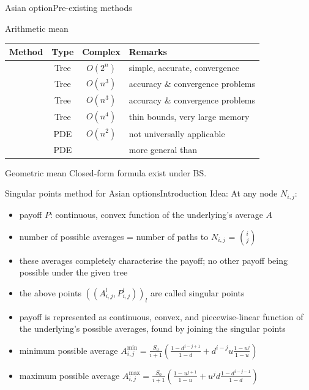 \documentclass[utf8,t,compress,xcolor=svgnames,handout]{beamer}
\begin{document}
	
	\begin{frame}{Asian option}{Pre-existing methods}
		\begin{block}{Arithmetic mean}
			\begin{tabular}{cccl}
				\toprule
				Method  &  Type  &  Complex  &  Remarks  \\
				\midrule
				\cite{Cox1979}  &  Tree  &  \alert{$ O(2^n) $}  &  simple, accurate, convergence  \\
				\cite{Hull1993}  &  Tree  &  $ O(n^3) $  &  accuracy \& convergence problems  \\
				\cite{Barraquand1996}  &  Tree  &  $ O(n^3) $  &  accuracy \& convergence problems  \\
				\cite{Chalasani1999}  &  Tree  &  $ O(n^4) $  &  thin bounds, very large memory  \\
				\cite{Vecer2001}  &  PDE  &  $ O(n^2) $  &  not universally applicable  \\
				\cite{dHalluin2005}  &  PDE  &    &  more general than \cite{Vecer2001} \\
				\bottomrule
			\end{tabular}
		\end{block}
		
		\begin{block}{Geometric mean}
			Closed-form formula exist under BS.
		\end{block}
	\end{frame}
	
	
	\begin{frame}{Singular points method for Asian options}{Introduction}
		Idea: At any node $ N_{i,j} $:
		\begin{itemize}
			\item payoff $ P $: continuous, convex function of the underlying's average $ A $
			\item number of possible averages = number of paths to $ N_{i,j} $ = $ \binom{i}{j} $
			\item these averages completely characterise the payoff; no other payoff being possible under the given tree
			\item the above points $ ((A_{i,j}^l, P_{i,j}^l))_l $ are called \alert{singular points}
			\item payoff is represented as continuous, convex, and piecewise-linear function of the underlying's possible averages, found by joining the singular points
			\item minimum possible average $ A_{i,j}^{\min} = \frac{S_0}{i+1} \left( \frac{1 - d^{i-j+1}}{1-d} + d^{i-j} u \frac{1 - u^{j}}{1-u} \right)$
			\item maximum possible average $ A_{i,j}^{\max} = \frac{S_0}{i+1} \left( \frac{1 - u^{j+1}}{1-u} + u^{j} d \frac{1 - d^{i-j-1}}{1-d} \right) $
		\end{itemize}
	\end{frame}
	
\end{document}
